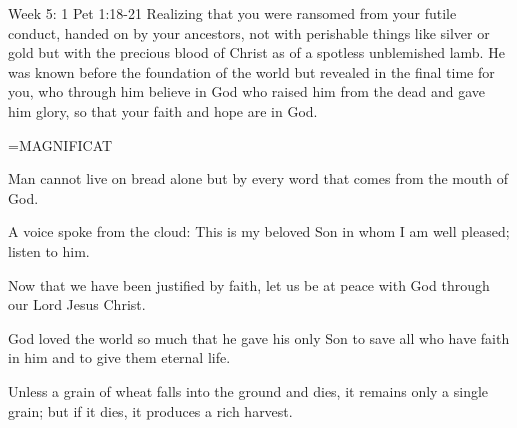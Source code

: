 Week 5:    1 Pet 1:18-21    Realizing that you were ransomed from your futile conduct, handed on by your ancestors, not with perishable things like silver or gold but with the precious blood of Christ as of a spotless unblemished lamb. He was known before the foundation of the world but revealed in the final time for you, who through him believe in God who raised him from the dead and gave him glory, so that your faith and hope are in God. 

\hangindent=\parindent \small MAGNIFICAT
\begin{description}[labelindent=\parindent, leftmargin=*]
\item [Week 1:] 	Man cannot live on bread alone but by every word that comes from the mouth of God.
\item [Week 2:] 	A voice spoke from the cloud: This is my beloved Son in whom I am well pleased; listen to him.
\item [Week 3:] 	Now that we have been justified by faith, let us be at peace with God through our Lord Jesus Christ.
\item [Week 4:] 	God loved the world so much that he gave his only Son to save all who have faith in him and to give them eternal life.
\item [Week 5:] 	Unless a grain of wheat falls into the ground and dies, it remains only a single grain; but if it dies, it produces a rich harvest.
\end{description}

